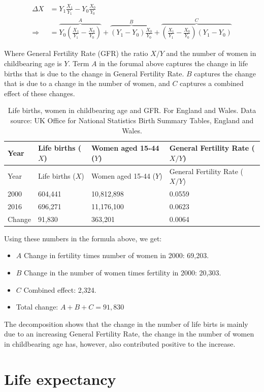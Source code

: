 \documentclass[]{book}
\providecommand{\tightlist}{%
  \setlength{\itemsep}{0pt}\setlength{\parskip}{0pt}}
\begin{document}
\begin{align}
    \Delta X&=Y_1\frac{X_1}{Y_1}-Y_0\frac{X_0}{Y_0}\nonumber\\
\Rightarrow &=\overbrace{Y_0\left(\frac{X_1}{Y_1}-\frac{X_0}{Y_0}\right)}^{A}+\overbrace{\left(Y_1-Y_0\right)\frac{X_0}{Y_0}}^{B}+
    \overbrace{\left(\frac{X_1}{Y_1}-\frac{X_0}{Y_0}\right)\left(Y_1-Y_0\right)}^{C}
\end{align}

Where General Fertility Rate (GFR) the ratio \(X/Y\) and the number of women in childbearing age is \(Y\). Term \(A\) in the forumal above captures the change in life births that is due to the change in General Fertility Rate. \(B\) captures the change that is due to a change in the number of women, and \(C\) captures a combined effect of these changes.

\begin{longtable}[]{@{}llll@{}}
\caption{\label{tab:deathtx} Life births, women in childbearing age and GFR. For England and Wales. Data source: UK Office for National Statistics Birth Summary Tables, England and Wales.}\tabularnewline
\toprule
Year & Life births (\(X\)) & Women aged 15-44 (\(Y\)) & General Fertility Rate (\(X/Y\))\tabularnewline
\midrule
\endfirsthead
\toprule
Year & Life births (\(X\)) & Women aged 15-44 (\(Y\)) & General Fertility Rate (\(X/Y\))\tabularnewline
\midrule
\endhead
2000 & 604,441 & 10,812,898 & 0.0559\tabularnewline
2016 & 696,271 & 11,176,100 & 0.0623\tabularnewline
Change & 91,830 & 363,201 & 0.0064\tabularnewline
\bottomrule
\end{longtable}

Using these numbers in the formula above, we get:

\begin{itemize}
\tightlist
\item
  \(A\) Change in fertility times number of women in 2000: 69,203.
\item
  \(B\) Change in the number of women times fertility in 2000: 20,303.
\item
  \(C\) Combined effect: 2,324.
\item
  Total change: \(A+B+C= 91,830\)
\end{itemize}

The decomposition shows that the change in the number of life birts is mainly due to an increasing General Fertility Rate, the change in the number of women in childbearing age has, however, also contributed positive to the increase.

\hypertarget{life-expectancy}{%
\section{Life expectancy}\label{life-expectancy}}
\end{document}
